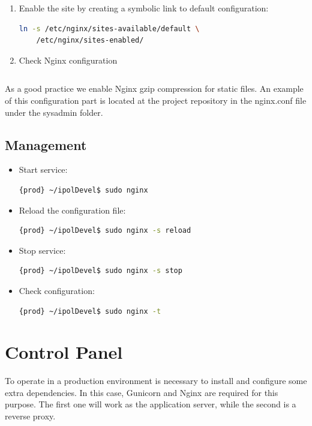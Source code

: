 \documentclass[a4paper,12pt]{article}
\begin{document}
\begin{enumerate}
    \item Enable the site by creating a symbolic link to default configuration:
    \begin{lstlisting}[language=Bash]
    ln -s /etc/nginx/sites-available/default \
    /etc/nginx/sites-enabled/
    \end{lstlisting}

    \item Check Nginx configuration
    \begin{lstlisting}[language=Bash]

    \end{lstlisting}
\end{enumerate}

As a good practice we enable Nginx gzip compression for static files. An example of this configuration part is located at the project repository 
in the nginx.conf file under the sysadmin folder.

\subsection{Management}

\begin{itemize}
    \item Start service:
    \begin{lstlisting}[language=Bash]
    {prod} ~/ipolDevel$ sudo nginx
    \end{lstlisting}
    \item Reload the configuration file:
    \begin{lstlisting}[language=Bash]
    {prod} ~/ipolDevel$ sudo nginx -s reload
    \end{lstlisting}
    \item Stop service:
    \begin{lstlisting}[language=Bash]
    {prod} ~/ipolDevel$ sudo nginx -s stop
    \end{lstlisting}
    \item Check configuration:
    \begin{lstlisting}[language=Bash]
    {prod} ~/ipolDevel$ sudo nginx -t
    \end{lstlisting}
\end{itemize}


\section{Control Panel}
To operate in a production environment is necessary to install and configure some extra dependencies. In this case, Gunicorn and Nginx are
required for this purpose. The first one will work as the application server, while the second is a reverse proxy.
\end{document}
